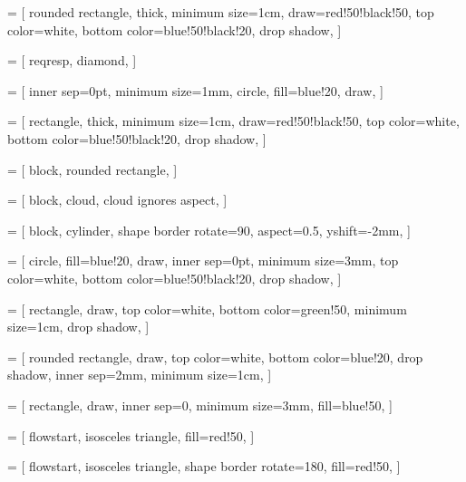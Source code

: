  = [
rounded rectangle,
thick,
minimum size=1cm,
draw=red!50!black!50,
top color=white,
bottom color=blue!50!black!20,
drop shadow,
]

 = [
reqresp,
diamond,
]

 = [
inner sep=0pt,
minimum size=1mm,
circle,
fill=blue!20,
draw,
]

 = [
rectangle,
thick,
minimum size=1cm,
draw=red!50!black!50,
top color=white,
bottom color=blue!50!black!20,
drop shadow,
]

 = [
block,
rounded rectangle,
]

 = [
block,
cloud,
cloud ignores aspect,
]

 = [
block,
cylinder,
shape border rotate=90,
aspect=0.5,
yshift=-2mm,
]

 = [
circle,
fill=blue!20,
draw,
inner sep=0pt,
minimum size=3mm,
top color=white,
bottom color=blue!50!black!20,
drop shadow,
]

 = [
rectangle,
draw,
top color=white,
bottom color=green!50,
minimum size=1cm,
drop shadow,
]

 = [
rounded rectangle,
draw,
top color=white,
bottom color=blue!20,
drop shadow,
inner sep=2mm,
minimum size=1cm,
]

 = [
rectangle,
draw,
inner sep=0,
minimum size=3mm,
fill=blue!50,
]

 = [
flowstart,
isosceles triangle,
fill=red!50,
]

 = [
flowstart,
isosceles triangle,
shape border rotate=180,
fill=red!50,
]

\newcommand{\flow}[6]
{
\node[flowstart] (s#2) at (#3,-#2){};
\node[flowend-#1](e#2) at (#4,-#2){};
\path (s#2) edge node(m#2){} (e#2){};
\node[above](a#2) at  (m#2){\texttt{#5}};
\node[below](b#2) at  (m#2){\texttt{#6}};
}